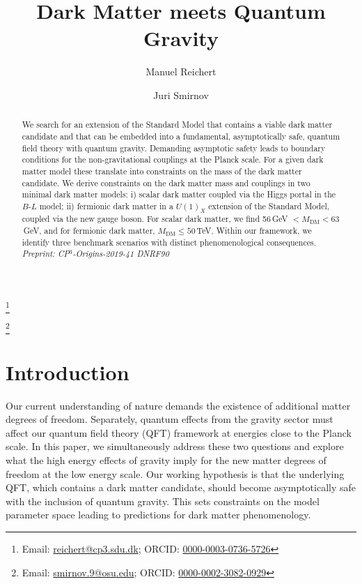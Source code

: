 \documentclass[aps,prd,twocolumn,preprintnumbers,superscriptaddress,nobibnotes,floatfix,longbibliography]{revtex4-1}
\newcommand{\MDM}{M_{\text{DM}}}
\begin{document}
\title{\Large\color{rossoCP3} Dark Matter meets Quantum Gravity}
\author{Manuel {\sc Reichert}}
\thanks{{\scriptsize Email}: \href{mailto:reichert@cp3.sdu.dk}{reichert@cp3.sdu.dk}; {\scriptsize ORCID}: \href{https://orcid.org/0000-0003-0736-5726}{ 0000-0003-0736-5726}}
\author{Juri {\sc Smirnov}}
\thanks{{\scriptsize Email}: \href{mailto:smirnov.9@osu.edu}{smirnov.9@osu.edu}; {\scriptsize ORCID}: \href{https://orcid.org/0000-0002-3082-0929}{ 0000-0002-3082-0929}}

\begin{abstract}
We search for an extension of the Standard Model that contains a viable dark matter candidate and that can be embedded into a fundamental, asymptotically safe, quantum field theory with quantum gravity.
Demanding asymptotic safety leads to boundary conditions for the non-gravitational couplings at the Planck scale.
For a given dark matter model these translate into constraints on the mass of the dark matter candidate. 
We derive constraints on the dark matter mass and couplings in two minimal dark matter models:
i) scalar dark matter coupled via the Higgs portal in the $B$-$L$ model;
ii) fermionic dark matter in a $U(1)_X$ extension of the Standard Model, coupled via the new gauge boson.
For scalar dark matter, we find 56\,GeV $ <  \MDM < 63$\,GeV, and for fermionic dark matter, $\MDM \leq 50$\,TeV.
Within our framework, we identify three benchmark scenarios with distinct phenomenological consequences. 
\\
[.3cm]
{\footnotesize  \it Preprint: CP$^3$-Origins-2019-41 DNRF90
}


\end{abstract}

\maketitle

\section{Introduction}
Our current understanding of nature demands the existence of additional matter degrees of freedom. Separately, quantum effects from the gravity sector must affect our quantum field theory (QFT) framework at energies close to the Planck scale.  In this paper, we simultaneously address these two questions and explore what the high energy effects of gravity imply for the new matter degrees of freedom at the low energy scale.  Our working hypothesis is that the underlying QFT, which contains a dark matter candidate, should become asymptotically safe with the inclusion of quantum gravity. This sets constraints on the model parameter space leading to predictions for dark matter phenomenology.
\end{document}
